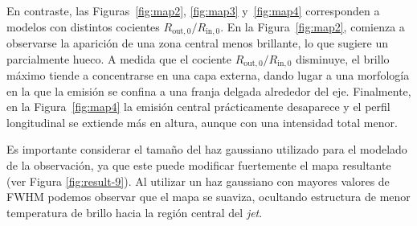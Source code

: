 	En contraste, las Figuras~\ref{fig:map2}, \ref{fig:map3} y~\ref{fig:map4} corresponden a modelos con distintos cocientes $R_\mathrm{out,0}/R_\mathrm{in,0}$.
	En la Figura~\ref{fig:map2}, comienza a observarse la aparición de una zona central menos brillante, lo que sugiere un \jet parcialmente hueco.
	A medida que el cociente $R_\mathrm{out,0}/R_\mathrm{in,0}$ disminuye, el brillo máximo tiende a concentrarse en una capa externa, dando lugar a una morfología en la que la emisión se confina a una franja delgada alrededor del eje.
	Finalmente, en la Figura~\ref{fig:map4} la emisión central prácticamente desaparece y el perfil longitudinal se extiende más en altura, aunque con una intensidad total menor.



	Es importante considerar el tamaño del haz gaussiano utilizado para el modelado de la observación, ya que este puede modificar fuertemente el mapa resultante (ver Figura \ref{fig:result-9}).
	Al utilizar un haz gaussiano con mayores valores de FWHM podemos observar que el mapa se suaviza, ocultando estructura de menor temperatura de brillo hacia la región central del \textit{jet}.


